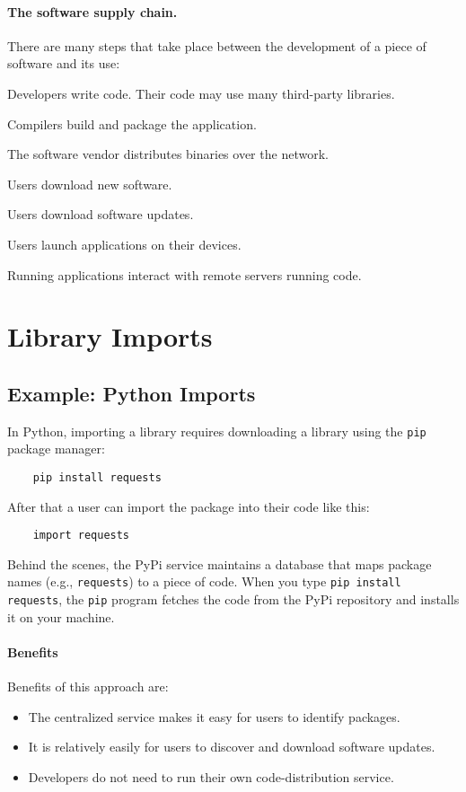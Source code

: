\paragraph{The software supply chain.}
There are many steps that take place between the
development of a piece of software and its use:
\begin{compactenum}
	\item Developers write code.
        Their code may use many third-party libraries.
	\item Compilers build and package the application. 
	\item The software vendor distributes binaries over the network.
	\item Users download new software.
	\item Users download software updates.
	\item Users launch applications on their devices.
	\item Running applications interact with remote servers running code.
\end{compactenum}

\section{Library Imports}

\subsection{Example: Python Imports}

In Python, importing a library requires downloading a library
using the \texttt{pip} package manager:
\begin{lstlisting}	
	pip install requests
\end{lstlisting}
After that a user can import the package into their code like this:
\begin{lstlisting}	
	import requests
\end{lstlisting}

Behind the scenes, the PyPi service maintains a database
that maps package names (e.g., \texttt{requests}) to 
a piece of code.
When you type \texttt{pip install requests}, the \texttt{pip}
program fetches the code from the PyPi repository and
installs it on your machine.

\paragraph{Benefits} Benefits of this approach are:
\begin{itemize}
  \item The centralized service makes it easy for users 
        to identify packages.
  \item It is relatively easily for users to discover
        and download software updates.
  \item Developers do not need to run their own 
        code-distribution service.
\end{itemize}

